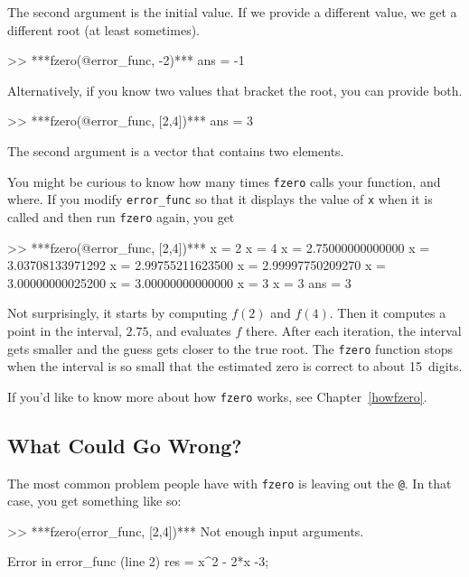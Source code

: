 
The second argument is the initial value.  If we provide a different
value, we get a different root (at least sometimes).

\begin{code}
>> ***fzero(@error_func, -2)***
ans = -1
\end{code}
\pagebreak

Alternatively, if you know two values that bracket the root,
you can provide both.

\begin{code}
>> ***fzero(@error_func, [2,4])***
ans = 3
\end{code}

The second argument is a vector that contains two elements.  


You might be curious to know how many times \lstinline{fzero} calls your
function, and where.  If you modify \lstinline{error_func} so that it displays
the value of \lstinline{x} when it is called and then run \lstinline{fzero}
again, you get

\begin{code}
>> ***fzero(@error_func, [2,4])***
x = 2
x = 4
x = 2.75000000000000
x = 3.03708133971292
x = 2.99755211623500
x = 2.99997750209270
x = 3.00000000025200
x = 3.00000000000000
x = 3
x = 3
ans = 3
\end{code}

Not surprisingly, it starts by computing $f(2)$ and $f(4)$.  Then it computes a point in the interval, $2.75$, and evaluates $f$ there.  After each iteration, the interval gets smaller and the guess gets closer to the true root.
The \lstinline{fzero} function stops when the interval is so small that the estimated
zero is correct to about 15~digits.
 
If you'd like to know more about how \lstinline{fzero} works, see Chapter~\ref{howfzero}.


\subsection{What Could Go Wrong?}

The most common problem people have with \lstinline{fzero} is leaving
out the \lstinline{@}.  In that case, you get something like so:

\begin{code}
>> ***fzero(error_func, [2,4])***
Not enough input arguments.

Error in error_func (line 2)
    res = x^2 - 2*x -3;
\end{code}

